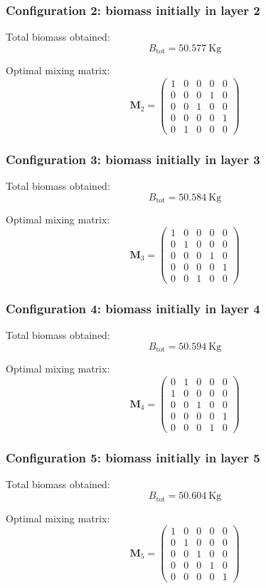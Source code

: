 \documentclass{article}
\begin{document}
\subsubsection{Configuration 2: biomass initially in layer 2}

Total biomass obtained:
\[
B_{\text{tot}} = 50.577 \ \mathrm{Kg}
\]

Optimal mixing matrix:
\[
\mathbf{M}_2 =
\begin{pmatrix}
1 & 0 & 0 & 0 & 0 \\
0 & 0 & 0 & 1 & 0 \\
0 & 0 & 1 & 0 & 0 \\
0 & 0 & 0 & 0 & 1 \\
0 & 1 & 0 & 0 & 0
\end{pmatrix}
\]

\subsubsection{Configuration 3: biomass initially in layer 3}

Total biomass obtained:
\[
B_{\text{tot}} = 50.584 \ \mathrm{Kg}
\]

Optimal mixing matrix:
\[
\mathbf{M}_3 =
\begin{pmatrix}
1 & 0 & 0 & 0 & 0 \\
0 & 1 & 0 & 0 & 0 \\
0 & 0 & 0 & 1 & 0 \\
0 & 0 & 0 & 0 & 1 \\
0 & 0 & 1 & 0 & 0
\end{pmatrix}
\]

\subsubsection{Configuration 4: biomass initially in layer 4}

Total biomass obtained:
\[
B_{\text{tot}} = 50.594 \ \mathrm{Kg}
\]

Optimal mixing matrix:
\[
\mathbf{M}_4 =
\begin{pmatrix}
0 & 1 & 0 & 0 & 0 \\
1 & 0 & 0 & 0 & 0 \\
0 & 0 & 1 & 0 & 0 \\
0 & 0 & 0 & 0 & 1 \\
0 & 0 & 0 & 1 & 0
\end{pmatrix}
\]

\subsubsection{Configuration 5: biomass initially in layer 5}

Total biomass obtained:
\[
B_{\text{tot}} = 50.604 \ \mathrm{Kg}
\]

Optimal mixing matrix:
\[
\mathbf{M}_5 =
\begin{pmatrix}
1 & 0 & 0 & 0 & 0 \\
0 & 1 & 0 & 0 & 0 \\
0 & 0 & 1 & 0 & 0 \\
0 & 0 & 0 & 1 & 0 \\
0 & 0 & 0 & 0 & 1
\end{pmatrix}
\]
\end{document}
